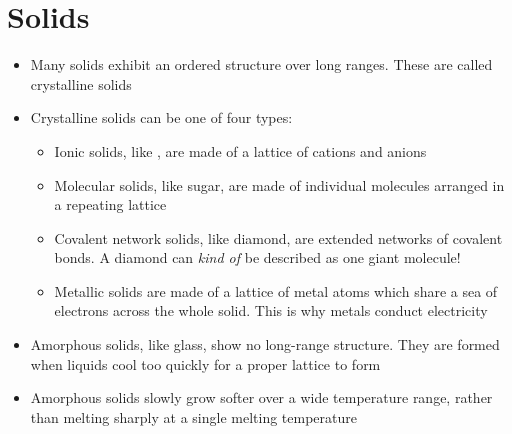 \documentclass[12pt, openany, letterpaper]{memoir}
\begin{document}
\section{Solids}
\begin{itemize}
	\item Many solids exhibit an ordered structure over long ranges. These are called crystalline solids
	\item Crystalline solids can be one of four types:
	\begin{itemize}
		\item Ionic solids, like , are made of a lattice of cations and anions
		\item Molecular solids, like sugar, are made of individual molecules arranged in a repeating lattice
		\item Covalent network solids, like diamond, are extended networks of covalent bonds. A diamond can \emph{kind of} be described as one giant molecule!
		\item Metallic solids are made of a lattice of metal atoms which share a sea of electrons across the whole solid. This is why metals conduct electricity
	\end{itemize}
	\item Amorphous solids, like glass, show no long-range structure. They are formed when liquids cool too quickly for a proper lattice to form
	\item Amorphous solids slowly grow softer over a wide temperature range, rather than melting sharply at a single melting temperature
\end{itemize}
\end{document}
